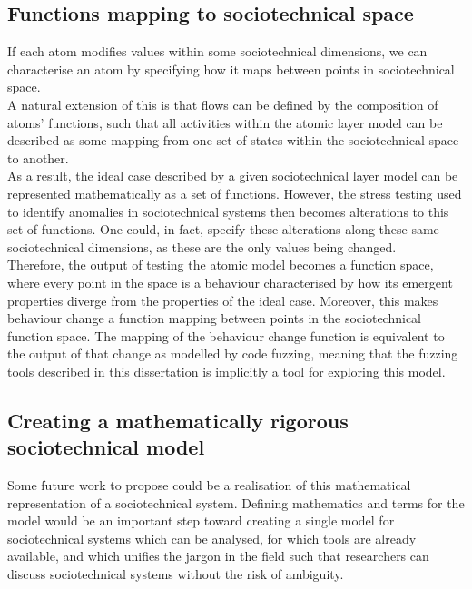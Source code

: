 \subsection{Functions mapping to sociotechnical space}
If each atom modifies values within some sociotechnical dimensions, we can characterise an atom by specifying how it maps between points in sociotechnical space.\\
A natural extension of this is that flows can be defined by the composition of atoms' functions, such that all activities within the atomic layer model can be described as some mapping from one set of states within the sociotechnical space to another.\\
As a result, the ideal case described by a given sociotechnical layer model can be represented mathematically as a set of functions. However, the stress testing used to identify anomalies in sociotechnical systems then becomes alterations to this set of functions. One could, in fact, specify these alterations along these same sociotechnical dimensions, as these are the only values being changed. \\
Therefore, the output of testing the atomic model becomes a function space, where every point in the space is a behaviour characterised by how its emergent properties diverge from the properties of the ideal case. Moreover, this makes behaviour change a function mapping between points in the sociotechnical function space. The mapping of the behaviour change function is equivalent to the output of that change as modelled by code fuzzing, meaning that the fuzzing tools described in this dissertation is implicitly a tool for exploring this model.

\subsection{Creating a mathematically rigorous sociotechnical model}
\label{rigorous_sociotechnical_model}
Some future work to propose could be a realisation of this mathematical representation of a sociotechnical system. Defining mathematics and terms for the model would be an important step toward creating a single model for sociotechnical systems which can be analysed, for which tools are already available, and which unifies the jargon in the field such that researchers can discuss sociotechnical systems without the risk of ambiguity. 

